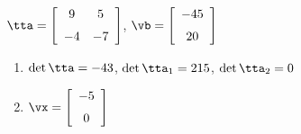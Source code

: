 {$\tta = \left[ \begin {array}{cc} 9&5\\\noalign{\medskip}-4&-7\end {array}
 \right] $,
 \quad
$\vb = \left[ \begin {array}{c} -45\\\noalign{\medskip}20\end {array}
 \right]$}
{\begin{enumerate}
\item	$\det{\tta} = -43$, $\det{\tta_1} = 215$, $\det{\tta_2} = 0$
\item $\vx = \left[ \begin {array}{c} -5\\\noalign{\medskip}0\end {array} \right]$
\end{enumerate}
}

